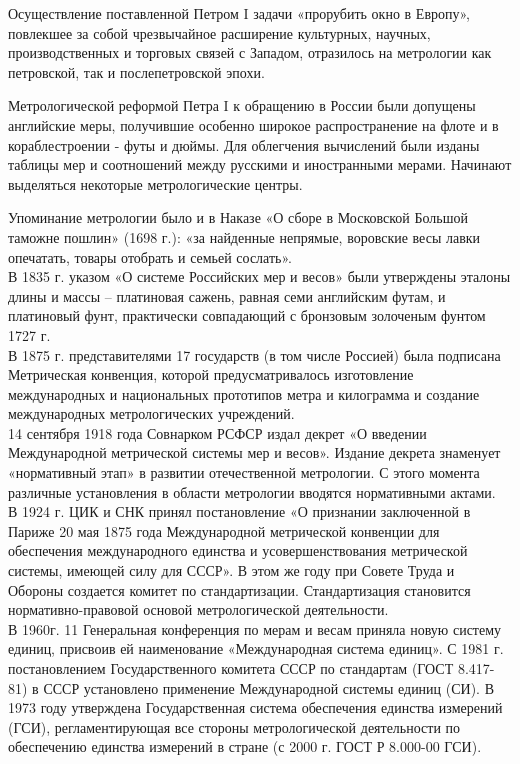 \documentclass[14pt, a4paper] {ncc}
\begin{document}
Осуществление поставленной Петром I задачи «прорубить окно в Европу»,
повлекшее за собой чрезвычайное расширение культурных, научных,
производственных и торговых связей с Западом, отразилось на метрологии
как петровской, так и послепетровской эпохи.

Метрологической реформой Петра I к обращению в России были допущены
английские меры, получившие особенно широкое распространение на флоте
и в кораблестроении - футы и дюймы. Для облегчения вычислений были изданы
таблицы мер и соотношений между русскими и иностранными мерами. Начинают
выделяться некоторые метрологические центры. 

Упоминание метрологии было и в Наказе «О сборе в Московской
Большой таможне пошлин» (1698 г.): «за найденные непрямые, воровские весы
лавки опечатать, товары отобрать и семьей сослать».\\

В 1835 г. указом «О системе Российских мер и весов» были утверждены эталоны
длины и массы – платиновая сажень, равная семи английским футам, и
платиновый фунт, практически совпадающий с бронзовым золоченым фунтом 1727 г.\\

В 1875 г. представителями 17 государств (в том числе Россией) была подписана
Метрическая конвенция, которой предусматривалось изготовление
международных и национальных прототипов метра и килограмма и создание
международных метрологических учреждений.\\

14 сентября 1918 года Совнарком РСФСР издал декрет «О введении Международной
метрической системы мер и весов». Издание декрета знаменует «нормативный
этап» в развитии отечественной метрологии. С этого момента различные
установления в области метрологии вводятся нормативными актами.\\

В 1924 г. ЦИК и СНК принял постановление «О
признании заключенной в Париже 20 мая 1875 года Международной метрической
конвенции для обеспечения международного единства и усовершенствования
метрической системы, имеющей силу для СССР». В этом же году при Совете
Труда и Обороны создается комитет по стандартизации. Стандартизация
становится нормативно-правовой основой метрологической деятельности.\\

В 1960г. 11 Генеральная конференция по мерам и весам приняла новую систему
единиц, присвоив ей наименование «Международная система единиц». С 1981
г. постановлением Государственного комитета СССР по стандартам (ГОСТ 8.417-81)
в СССР установлено применение Международной системы единиц (СИ). В 1973 году
утверждена Государственная система обеспечения единства измерений
(ГСИ), регламентирующая все стороны метрологической деятельности по
обеспечению единства измерений в стране (с 2000 г. ГОСТ Р 8.000-00 ГСИ).\\
\end{document}
